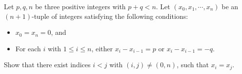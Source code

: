 Let $ p,q,n$ be three positive integers with $ p + q < n$. Let $ (x_{0},x_{1},\cdots ,x_{n})$ be an $ (n + 1)$-tuple of integers satisfying the following conditions:

\begin{itemize}
	\item $ x_{0} = x_{n} = 0$,  and
	\item For each $ i$ with $ 1\leq i\leq n$,  either $ x_{i} - x_{i - 1} = p$ or $ x_{i} - x_{i - 1} = - q$.
\end{itemize}

Show that there exist indices $ i < j$ with $ (i,j)\neq (0,n)$,  such that $ x_{i} = x_{j}$.
